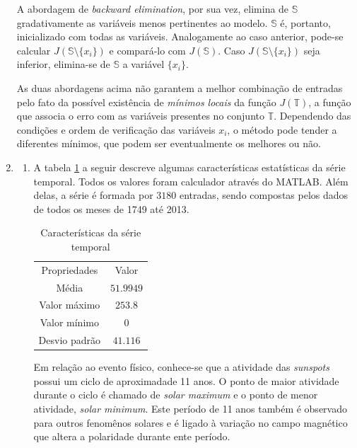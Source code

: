 \begin{enumerate}
			  A abordagem de  \textit{backward elimination}, por sua vez, elimina de \(\mathbb{S}\)
			  gradativamente as variáveis menos pertinentes ao modelo. \(\mathbb{S}\) é, portanto,
			  inicializado com todas as variáveis. Analogamente ao caso anterior, pode-se
			  calcular \(J\left(\mathbb{S} \setminus \{ x_i \} \right)\) e compará-lo com
			  \(J\left(\mathbb{S}\right)\). Caso \(J\left(\mathbb{S} \setminus \{ x_i \} \right)\) seja
			  inferior, elimina-se de \(\mathbb{S}\) a variável \(\{x_i\}\).
			  
			  As duas abordagens acima não garantem a melhor combinação de entradas pelo
			  fato da possível existência de \textit{mínimos locais} da função
			  \(J(\mathbb{T})\), a função que associa o erro com as variáveis presentes no
			  conjunto \(\mathbb{T}\). Dependendo das condições e ordem de verificação das
			  variáveis \(x_i\), o método pode tender a diferentes mínimos, que podem ser
			  eventualmente os melhores ou não.
			
			
			  \item \begin{enumerate}
			    \item A tabela \ref{tab:estat_tab} a seguir descreve algumas características estatísticas da série temporal. Todos os valores foram calculador através do MATLAB. Além delas, a série é formada por \(3180\) entradas, sendo compostas pelos dados de todos os meses de 1749 até 2013. 
			    
			    \begin{table}[h]
				    \centering
					\caption{\label{tab:estat_tab} Características da série temporal}
					\begin{tabular}{|c | c |}
						\hline
						Propriedades & Valor \\	\hhline{|=|=|}
						Média & \(51.9949\) \\ \hline 
						Valor máximo & \(253.8\) \\ \hline 
						Valor mínimo & \(0\) \\ \hline 			
						Desvio padrão & \(41.116\) \\ \hline 			
					\end{tabular}	    
			    \end{table}    
			    
			    Em relação ao evento físico, conhece-se que a atividade das
			    \textit{sunspots} possui um ciclo de aproximadade 11 anos.  O ponto de
			    maior atividade durante o ciclo é chamado de \textit{solar maximum} e o
			    ponto de menor atividade, \textit{solar minimum}. Este período de 11
			    anos também é observado para outros fenomênos solares e é ligado à
			    variação no campo magnético que altera a polaridade durante ente período.


\end{enumerate}
\end{enumerate}
